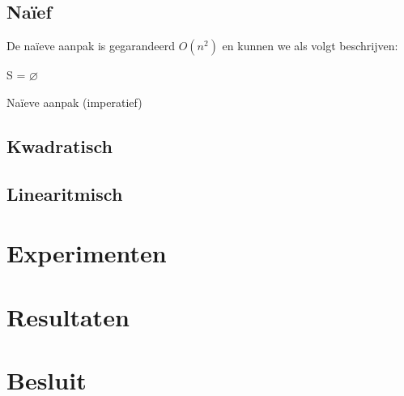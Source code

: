 \documentclass[12pt,a4paper]{article}
\begin{document}
\subsection{Na\"ief}
\label{sec:naief}

De naïeve aanpak is gegarandeerd $O(n^2)$ en kunnen we als volgt beschrijven:

\begin{algorithm}[H]
  S = $\varnothing$\;
 \caption{Na\"ieve aanpak (imperatief)}
\end{algorithm}

\subsection{Kwadratisch}
\label{sec:kwadratisch}

\subsection{Linearitmisch}
\label{sec:linearitmisch}


\section{Experimenten}



\section{Resultaten}

\section{Besluit}

\listoftodos
\end{document}
